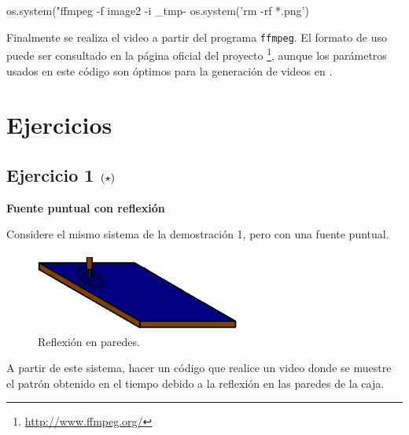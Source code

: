 \begin{listing}[style=python, numbers = none]
os.system("ffmpeg -f image2 -i _tmp-%
os.system('rm -rf *.png')
\end{listing}
Finalmente se realiza el video a partir del programa \texttt{ffmpeg}. El 
formato de uso puede ser consultado en la página oficial del proyecto 
\footnote{\url{http://www.ffmpeg.org/}}, aunque los parámetros usados en
este código son óptimos para la generación de videos en \python.




\newpage
\section{Ejercicios}
\label{sec:ejercicios}

\subsection*{Ejercicio 1 \large{$\left( \star \right)$}}

\textbf{Fuente puntual con reflexión}

Considere el mismo sistema de la demostración 1, pero con una fuente puntual. 
\begin{figure}[htbp]
	\centering
	\includegraphics[width=0.60\textwidth]
	{./pictures/interference_reflex.png}

	\caption{\small{Reflexión en paredes.}}
	
	\label{fig:wall_reflection}
\end{figure}

A partir de este sistema, hacer un código que realice un video donde se
muestre el patrón obtenido en el tiempo debido a la reflexión en las paredes 
de la caja. 


